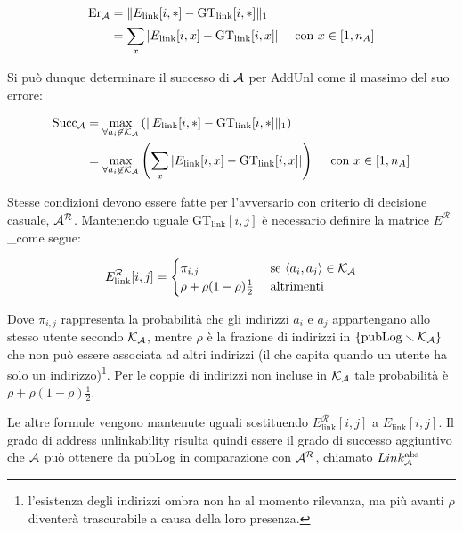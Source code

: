 \[ \begin{aligned} \text{Er}_{\mathcal{A}} &= \| E_\text{link} [i, *] - \text{GT}_\text{link} [i,*]\|_1 \\
   &= \sum_x | E_\text{link} [i, x] - \text{GT}_\text{link} [i,x] | \quad \text{ con } x \in [1, n_A]
   \end{aligned}\]

Si può dunque determinare il successo di $\mathcal{A}$ per AddUnl come il massimo del suo errore:

\[ \begin{aligned} \text{Succ}_{\mathcal{A}} &= \max_{\forall a_i \not\in \mathcal{K}_\mathcal{A}} \left(\| E_\text{link} [i, *] - \text{GT}_\text{link} [i,*]\|_1 \right) \\
   &= \max_{\forall a_i \not\in \mathcal{K}_\mathcal{A}}\left(\sum_x | E_\text{link} [i, x] - \text{GT}_\text{link} [i,x] |\right) \quad \text{ con } x \in [1, n_A]
   \end{aligned} \]

Stesse condizioni devono essere fatte per l'avversario con criterio di decisione casuale, $\mathcal{A}^\mathcal{R}$. Mantenendo uguale $\text{GT}_\text{link} [i,j]$ è necessario definire la matrice $E^{\mathcal{R}}$\_come segue:

\[E^{\mathcal{R}}_\text{link} [i, j] = \begin{cases} \pi_{i,j} &\text{ se } \langle a_i, a_j \rangle \in \mathcal{K}_\mathcal{A} \\ \rho + \rho(1-\rho)\tfrac{1}{2} &\text{ altrimenti} \end{cases}\]

Dove $\pi_{i,j}$ rappresenta la probabilità che gli indirizzi $a_i$ e $a_j$ appartengano allo stesso utente secondo $\mathcal{K}_\mathcal{A}$, mentre $\rho$ è la frazione di indirizzi in $\{\text{pubLog} \smallsetminus \mathcal{K}_\mathcal{A}\}$ che non può essere associata ad altri indirizzi (il che capita quando un utente ha solo un indirizzo)\footnote{l'esistenza degli indirizzi ombra   non ha al momento rilevanza, ma più avanti $\rho$ diventerà   trascurabile a causa della loro presenza.}. Per le coppie di indirizzi non incluse in $\mathcal{K}_\mathcal{A}$ tale probabilità è $\rho + \rho(1-\rho)\tfrac{1}{2}$.

Le altre formule vengono mantenute uguali sostituendo $E^{\mathcal{R}}_\text{link} [i, j]$ a $E_\text{link} [i, j]$. Il grado di address unlinkability risulta quindi essere il grado di successo aggiuntivo che $\mathcal{A}$ può ottenere da pubLog in comparazione con $\mathcal{A}^\mathcal{R}$, chiamato $Link^{\text{abs}}_{\mathcal{A}}$

